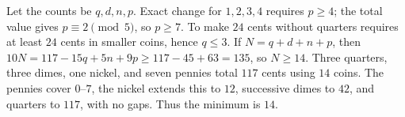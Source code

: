 Let the counts be $q,d,n,p$. Exact change for $1,2,3,4$ requires $p\ge4$; the total value gives $p\equiv2\pmod5$, so $p\ge7$. To make $24$ cents without quarters requires at least $24$ cents in smaller coins, hence $q\le3$. If $N=q+d+n+p$, then $10N=117-15q+5n+9p\ge117-45+63=135$, so $N\ge14$. Three quarters, three dimes, one nickel, and seven pennies total $117$ cents using $14$ coins. The pennies cover $0$--$7$, the nickel extends this to $12$, successive dimes to $42$, and quarters to $117$, with no gaps. Thus the minimum is $\boxed{14}$.
